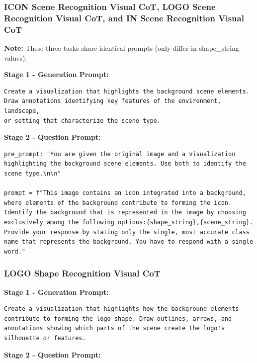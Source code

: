 \documentclass{article}
\theoremstyle{plain}
\theoremstyle{definition}
\theoremstyle{remark}
\begin{document}
\subsubsection{ICON Scene Recognition Visual CoT, LOGO Scene Recognition Visual CoT, and IN Scene Recognition Visual CoT}

\textbf{Note:} These three tasks share identical prompts (only differ in shape\_string values).

\textbf{Stage 1 - Generation Prompt:}

\begin{verbatim}
Create a visualization that highlights the background scene elements.
Draw annotations identifying key features of the environment, landscape,
or setting that characterize the scene type.
\end{verbatim}

\textbf{Stage 2 - Question Prompt:}

\begin{verbatim}
pre_prompt: "You are given the original image and a visualization
highlighting the background scene elements. Use both to identify the
scene type.\n\n"

prompt = f"This image contains an icon integrated into a background,
where elements of the background contribute to forming the icon.
Identify the background that is represented in the image by choosing
exclusively among the following options:{shape_string},{scene_string}.
Provide your response by stating only the single, most accurate class
name that represents the background. You have to respond with a single
word."
\end{verbatim}

\subsubsection{LOGO Shape Recognition Visual CoT}

\textbf{Stage 1 - Generation Prompt:}

\begin{verbatim}
Create a visualization that highlights how the background elements
contribute to forming the logo shape. Draw outlines, arrows, and
annotations showing which parts of the scene create the logo's
silhouette or features.
\end{verbatim}

\textbf{Stage 2 - Question Prompt:}
\end{document}
